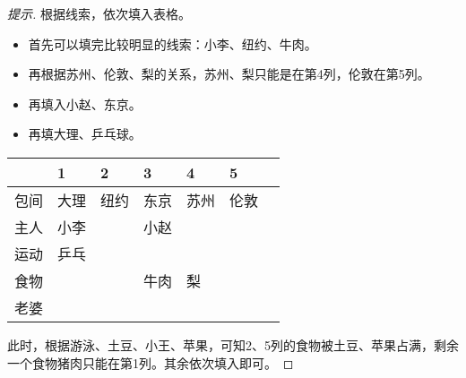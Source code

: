 \begin{proof}[提示]
  根据线索，依次填入表格。
  \begin{itemize}
  \item 首先可以填完比较明显的线索：小李、纽约、牛肉。
  \item 再根据苏州、伦敦、梨的关系，苏州、梨只能是在第4列，伦敦在第5列。
  \item 再填入小赵、东京。
  \item 再填大理、乒乓球。
\end{itemize}

\noindent\begin{minipage}{\textwidth}\setlength{\parindent}{2em}
\begin{center}
  \begin{tabularx}{\textwidth}{|c *{6}{|Y}}
    \hline
         & 1    & 2    & 3     & 4    & 5    \\\hline
    包间 & 大理 & 纽约 & 东京  & 苏州 & 伦敦 \\\hline
    主人 & 小李 &      & 小赵  &      &      \\\hline
    运动 & 乒乓 &      &       &      &      \\\hline 
    食物 &      &      & 牛肉  & 梨   &      \\\hline
    老婆 &      &      &       &      &      \\\hline
  \end{tabularx}\vspace{.5cm}
\end{center}
\end{minipage}

此时，根据游泳、土豆、小王、苹果，可知2、5列的食物被土豆、苹果占满，剩余一个食物猪肉只能在第1列。其余依次填入即可。
\end{proof}



